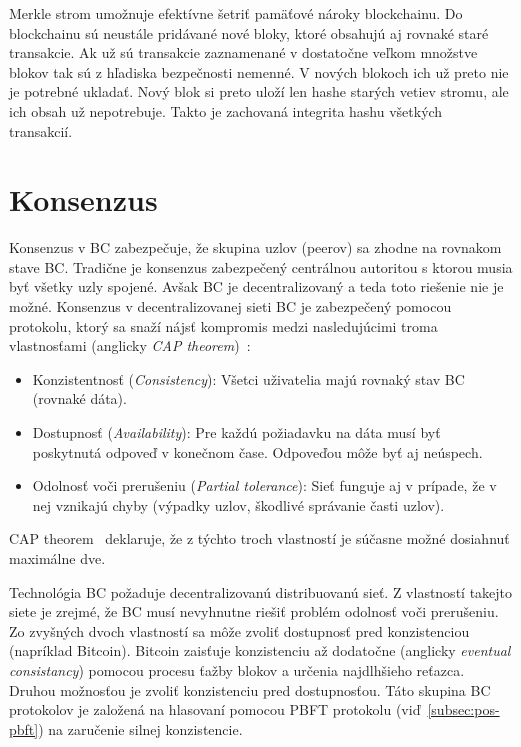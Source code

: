 Merkle strom umožnuje efektívne šetriť pamäťové nároky blockchainu. Do blockchainu sú neustále pridávané nové bloky, ktoré obsahujú aj rovnaké staré transakcie. Ak už sú transakcie zaznamenané v dostatočne veľkom množstve blokov tak sú z hľadiska bezpečnosti nemenné. V nových blokoch ich už preto nie je potrebné ukladať. Nový blok si preto uloží len hashe starých vetiev stromu, ale ich obsah už nepotrebuje. Takto je zachovaná integrita hashu všetkých transakcií.~\cite{satoshiBitcoin}


\chapter{Konsenzus}\label{chap:consenzus}

Konsenzus v BC zabezpečuje, že skupina uzlov (peerov) sa  zhodne na rovnakom stave BC. Tradične je konsenzus zabezpečený centrálnou autoritou s ktorou musia byť všetky uzly spojené. Avšak BC je decentralizovaný a teda toto riešenie nie je možné. Konsenzus v decentralizovanej sieti BC je zabezpečený pomocou protokolu, ktorý sa snaží nájsť kompromis medzi nasledujúcimi troma vlastnosťami (anglicky \textit{CAP theorem})~\cite{gilbertCAP, zhangConsensus, leporeConsensus}:
\begin{itemize}
	\item Konzistentnosť (\textit{Consistency}): Všetci uživatelia majú rovnaký stav BC (rovnaké dáta).
	\item Dostupnosť (\textit{Availability}): Pre každú požiadavku na dáta musí byť poskytnutá odpoveď v konečnom čase. Odpoveďou môže byť aj neúspech.
	\item Odolnosť voči prerušeniu (\textit{Partial tolerance}): Sieť funguje aj v prípade, že v nej vznikajú chyby (výpadky uzlov, škodlivé správanie časti uzlov).
\end{itemize}
CAP theorem~\cite{gilbertCAP} deklaruje, že z týchto troch vlastností je súčasne možné dosiahnuť maximálne dve.

Technológia BC požaduje decentralizovanú distribuovanú sieť. Z vlastností takejto siete je zrejmé, že BC musí nevyhnutne riešiť problém odolnosť voči prerušeniu. Zo zvyšných dvoch vlastností sa môže zvoliť dostupnosť pred konzistenciou (napríklad Bitcoin). Bitcoin zaisťuje konzistenciu až dodatočne (anglicky \textit{eventual consistancy}) pomocou procesu ťažby blokov a určenia najdlhšieho reťazca. Druhou možnosťou je zvoliť konzistenciu pred dostupnosťou. Táto skupina BC protokolov je založená na hlasovaní pomocou PBFT protokolu (viď~\ref{subsec:pos-pbft}) na zaručenie silnej konzistencie.~\cite{capViswanath}

